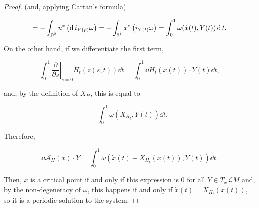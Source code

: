 \begin{proof}
(and, applying Cartan's formula)

$$= - \int_{\mathbb{D}^2} u^{\ast} \left( \operatorname d i_{Y(p)} \omega \right) = - \int_{\mathbb{S}^1} x^{\ast} \left( i_{Y(t)} \omega \right) = \int_0^1 \omega(\dot{x}(t),Y(t)) \operatorname d t .$$

On the other hand, if we differentiate the first term,

$$\int_0^1 \left. \frac{\partial}{\partial s} \right|_{s=0} H_t(z(s,t)) \dd t = \int_0^1 \dd H_t(x(t)) \cdot Y(t) \dd t ,$$

and, by the definition of $X_H$, this is equal to

$$- \int_0^1 \omega(X_{H_t},Y(t)) \dd t .$$

Therefore,

$$\dd \mathcal{A}_H(x) \cdot Y = \int_0^1 \omega(\dot{x}(t) - X_{H_t}(x(t)), Y(t)) \dd t .$$

Then, $x$ is a critical point if and only if this expression is $0$ for all $Y \in T_x\mathcal{L}M$ and, by the non-degeneracy of $\omega$, this happens if and only if $\dot{x}(t) = X_{H_t}(x(t))$, so it is a periodic solution to the system.
\end{proof}

